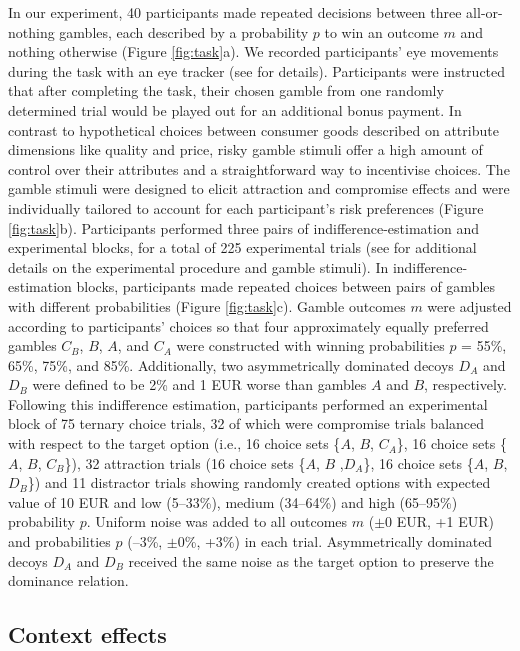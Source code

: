 \documentclass[11pt, a4paper]{article}
\begin{document}
In our experiment, 40 participants made repeated decisions between three all-or-nothing gambles, each described by a probability $p$ to win an outcome $m$ and nothing otherwise (Figure \ref{fig:task}a). We recorded participants' eye movements during the task with an eye tracker (see  for details). Participants were instructed that after completing the task, their chosen gamble from one randomly determined trial would be played out for an additional bonus payment. In contrast to hypothetical choices between consumer goods described on attribute dimensions like quality and price, risky gamble stimuli offer a high amount of control over their attributes and a straightforward way to incentivise choices. The gamble stimuli were designed to elicit attraction and compromise effects and were individually tailored to account for each participant's risk preferences (Figure \ref{fig:task}b). Participants performed three pairs of indifference-estimation and experimental blocks, for a total of 225 experimental trials (see  for additional details on the experimental procedure and gamble stimuli). In indifference-estimation blocks, participants made repeated choices between pairs of gambles with different probabilities (Figure \ref{fig:task}c). Gamble outcomes $m$ were adjusted according to participants' choices so that four approximately equally preferred gambles $C_B$, $B$, $A$, and $C_A$ were constructed with winning probabilities $p$ = 55\%, 65\%, 75\%, and 85\%. Additionally, two asymmetrically dominated decoys $D_A$ and $D_B$ were defined to be 2\% and 1 EUR worse than gambles $A$ and $B$, respectively. Following this indifference estimation, participants performed an experimental block of 75 ternary choice trials, 32 of which were compromise trials balanced with respect to the target option (i.e., 16 choice sets \{$A$, $B$, $C_A$\}, 16 choice sets \{$A$, $B$, $C_B$\}), 32 attraction trials (16 choice sets \{$A$, $B$ ,$D_A$\}, 16 choice sets \{$A$, $B$, $D_B$\}) and 11 distractor trials showing randomly created options with expected value of 10 EUR and low (5–33\%), medium (34–64\%) and high (65–95\%) probability $p$. Uniform noise was added to all outcomes $m$ ($\pm$0 EUR, +1 EUR) and probabilities $p$ (–3\%, $\pm$0\%, +3\%) in each trial. Asymmetrically dominated decoys $D_A$ and $D_B$ received the same noise as the target option to preserve the dominance relation.

\subsection*{Context effects}
\end{document}
